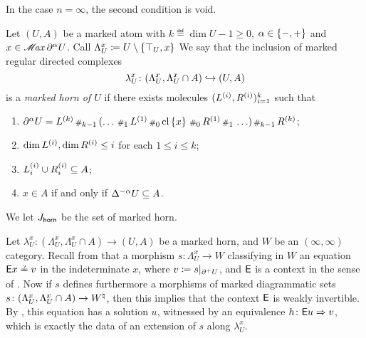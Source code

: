 \begin{rmk}
    In the case \( n = \infty \), the second condition is void.
\end{rmk}

\begin{dfn} 
    Let \( (U, A) \) be a marked atom with \( k \eqdef \dim U - 1 \geq 0 \), \( \a \in \set{-, +} \) and \( x \in \maxel{\bd{}{\a} U} \).
    Call \( \Lambda^x_U \eqdef U \setminus \set{\top_U, x} \)
    We say that the inclusion of marked regular directed complexes
    \begin{equation*}
        \lambda^x_U \colon (\Lambda^x_U, \Lambda^x_U \cap A) \incl (U, A) 
    \end{equation*}
    is a \emph{marked horn of \( U \)} if there exists molecules \( (\order{i}{L}, \order{i}{R})_{i = 1}^k \) such that
    \begin{enumerate}
        \item \( \bd{}{\a} U = \order{k}{L} \cp{k - 1} (\ldots \cp{1} \order{1}{L} \cp{0} \clset{x} \cp{0} \order{1}{R} \cp{1} \ldots) \cp{k - 1} \order{k}{R} \);
        \item \( \dim \order{i}{L}, \dim \order{i}{R} \le i \) for each \( 1 \le i \le k \);
        \item \( \gr{i}{\order{i}{L}} \cup \gr{i}{\order{i}{R}} \subseteq A \);
        \item \( x \in A \) if and only if \( \faces{}{-\a} U \subseteq A \).
    \end{enumerate}
    We let \( \Jhorn \) be the set of marked horn.
\end{dfn}

\begin{comm}
    Let \( \lambda^x_U \colon (\Lambda^x_U, \Lambda^x_U \cap A) \to (U, A) \) be a marked horn, and \( W \) be an \( (\infty, \infty) \)\nbd category.
    Recall from \cite[Comment 3.13]{chanavat2024model} that a morphism \( s \colon \Lambda^x_U \to W \) classifying in \( W \) an equation \( \fun{E}x \qeq v \) in the indeterminate \( x \), where \( v \eqdef \restr{s}{\bd{}{+}U} \), and \( \fun{E} \) is a context in the sense of \cite[3.1]{chanavat2024equivalences}.
    Now if \( s \) defines furthermore a morphisms of marked diagrammatic sets \( s \colon (\Lambda^x_U, \Lambda^x_U \cap A) \to \natmark{W} \), then this implies that the context \( \fun{E} \) is weakly invertible.
    By \cite[Lemma 5.10]{chanavat2024equivalences}, this equation has a solution \( u \), witnessed by an equivalence \( h \colon \fun{E}u \celto v \), which is exactly the data of an extension of \( s \) along \( \lambda^x_U \).
\end{comm}

